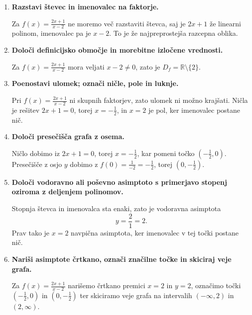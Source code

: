 \documentclass[11pt]{article}
\begin{document}
\begin{enumerate}[leftmargin=*]
  \item \textbf{Razstavi števec in imenovalec na faktorje.}
    \begin{primerbox}
      Za $f(x)=\frac{2x+1}{x-2}$ ne moremo več razstaviti števca, saj je $2x+1$ že linearni polinom, imenovalec pa je $x-2$. To je že najpreprostejša razcepna oblika.
    \end{primerbox}

  \item \textbf{Določi definicijsko območje in morebitne izločene vrednosti.}
    \begin{primerbox}
      Za $f(x)=\frac{2x+1}{x-2}$ mora veljati $x-2\ne 0$, zato je $D_f=\mathbb{R}\setminus\{2\}$.
    \end{primerbox}

  \item \textbf{Poenostavi ulomek; označi ničle, pole in luknje.}
    \begin{primerbox}
      Pri $f(x)=\frac{2x+1}{x-2}$ ni skupnih faktorjev, zato ulomek ni možno krajšati. Ničla je rešitev $2x+1=0$, torej $x=-\frac{1}{2}$, in $x=2$ je pol, ker imenovalec postane nič.
    \end{primerbox}

  \item \textbf{Določi presečišča grafa z osema.}
    \begin{primerbox}
      Ničlo dobimo iz $2x+1=0$, torej $x=-\frac{1}{2}$, kar pomeni točko $\left(-\frac{1}{2},0\right)$. Presečišče z osjo $y$ dobimo z $f(0)=\frac{1}{-2}=-\frac{1}{2}$, torej $\left(0,-\frac{1}{2}\right)$.
    \end{primerbox}

  \item \textbf{Določi vodoravno ali poševno asimptoto s primerjavo stopenj oziroma z deljenjem polinomov.}
    \begin{primerbox}
      Stopnja števca in imenovalca sta enaki, zato je vodoravna asimptota
      \[
      y=\frac{2}{1}=2.
      \]
      Prav tako je $x=2$ navpična asimptota, ker imenovalec v tej točki postane nič.
    \end{primerbox}

  \item \textbf{Nariši asimptote črtkano, označi značilne točke in skiciraj veje grafa.}
    \begin{primerbox}
      Za $f(x)=\frac{2x+1}{x-2}$ narišemo črtkano premici $x=2$ in $y=2$, označimo točki $\left(-\frac{1}{2},0\right)$ in $\left(0,-\frac{1}{2}\right)$ ter skiciramo veje grafa na intervalih $(-\infty,2)$ in $(2,\infty)$.
    \end{primerbox}
\end{enumerate}
\end{document}
